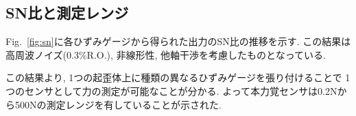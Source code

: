 
\subsection{SN比と測定レンジ}
Fig.~\ref{fig:sn}に各ひずみゲージから得られた出力のSN比の推移を示す. 
この結果は高周波ノイズ(0.3\%R.O.), 非線形性, 他軸干渉を考慮したものとなっている. 




この結果より, 1つの起歪体上に種類の異なるひずみゲージを張り付けることで
1つのセンサとして力の測定が可能なことが分かる.  
よって本力覚センサは0.2Nから500Nの測定レンジを有していることが示された.